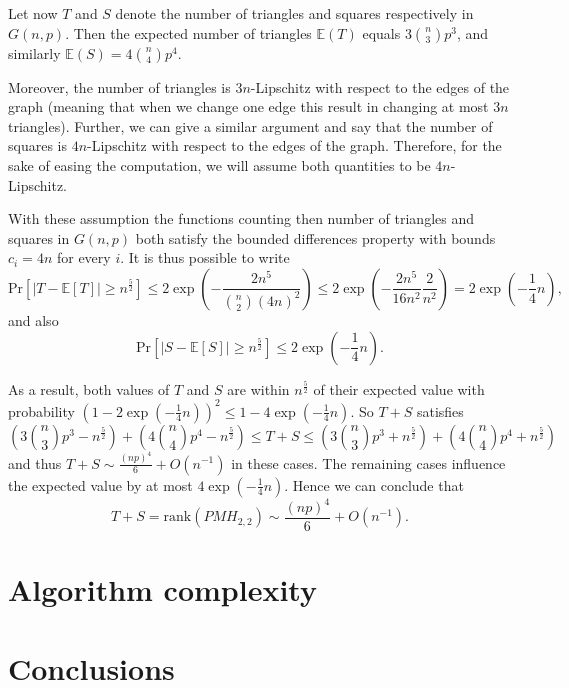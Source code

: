 \documentclass{article}
\newcommand{\E}{\mathbb{E}}
\newcommand{\Prob}{\mathrm{Pr}}
\newcommand{\rank}{\mathrm{rank}}
\begin{document}
	Let now $T$ and $S$ denote the number of triangles and squares respectively in $G(n,p)$.
	Then the expected number of triangles $\E(T)$ equals $3 \binom{n}{3}p^3$, and similarly $\E(S)=4 \binom{n}{4}p^4$.
	
	Moreover, the number of triangles is $3n$-Lipschitz with respect to the edges of the graph (meaning that when we change one edge this result in changing at most $3n$ triangles).
	Further, we can give a similar argument and say that the number of squares is $4n$-Lipschitz with respect to the edges of the graph.
	Therefore, for the sake of easing the computation, we will assume both quantities to be $4n$-Lipschitz.  
	
	With these assumption the functions counting then number of triangles and squares in $G(n,p)$ both satisfy the bounded differences property with bounds $c_i = 4n$ for every $i$.
	It is thus possible to write
	\[
	\Prob[\left|T - \E[T]\right|\geq n^{\frac{5}{2}}] \leq  2 \exp \left(-\frac{2n^5}{\binom{n}{2}(4n)^2} \right) \leq 2 \exp \left(-\frac{2n^5}{16 n^2} \frac{2}{n^2} \right) = 2 \exp \left(-\frac{1}{4}n \right),
	\]
	and also
	\[
	\Prob[\left|S - \E[S]\right|\geq n^{\frac{5}{2}}] \leq  2 \exp \left(-\frac{1}{4}n \right).
	\]
	
	As a result, both values of $T$ and $S$ are within $n^{\frac{5}{2}}$ of their expected value with probability $\left(1- 2\exp \left(-\frac{1}{4}n \right) \right)^2 \leq 1-4\exp\left(-\frac{1}{4}n\right)$.
	So $T+S$ satisfies 
	\[
	\left(3 \binom{n}{3}p^3 - n^{\frac{5}{2}}\right) + \left(4 \binom{n}{4}p^4 - n^{\frac{5}{2}}\right)
	\leq T+S \leq
	\left(3 \binom{n}{3}p^3 + n^{\frac{5}{2}}\right) + \left(4 \binom{n}{4}p^4 + n^{\frac{5}{2}}\right)
	\]
	and thus $T+S \sim \frac{(np)^4}{6} + O(n^{-1})$ in these cases.
	The remaining cases influence the expected value by at most $4\exp\left(-\frac{1}{4}n\right)$. 
	Hence we can conclude that
	\[
	T+S = \rank(PMH_{2,2}) \sim \frac{(np)^4}{6} + O(n^{-1}).
	\]
	
	
	\section{Algorithm complexity}
	
	\section{Conclusions}
	
	
	
	
\end{document}
